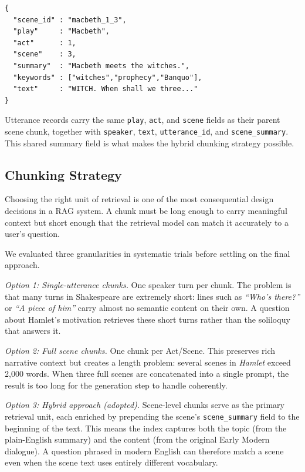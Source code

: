\documentclass[10pt,conference]{IEEEtran}
\begin{document}
\vspace{4pt}
\begin{minipage}{\columnwidth}
\begin{lstlisting}[caption={Scene-chunk record format (macbeth\_1\_3).}]
{
  "scene_id" : "macbeth_1_3",
  "play"     : "Macbeth",
  "act"      : 1,
  "scene"    : 3,
  "summary"  : "Macbeth meets the witches.",
  "keywords" : ["witches","prophecy","Banquo"],
  "text"     : "WITCH. When shall we three..."
}
\end{lstlisting}
\end{minipage}

\vspace{4pt}
Utterance records carry the same \texttt{play}, \texttt{act}, and
\texttt{scene} fields as their parent scene chunk, together with
\texttt{speaker}, \texttt{text}, \texttt{utterance\_id}, and
\texttt{scene\_summary}. This shared summary field is what makes the
hybrid chunking strategy possible.

\subsection{Chunking Strategy}

Choosing the right unit of retrieval is one of the most consequential
design decisions in a RAG system. A chunk must be long enough to carry
meaningful context but short enough that the retrieval model can match
it accurately to a user's question.

We evaluated three granularities in systematic trials before settling
on the final approach.

\medskip\noindent\textit{Option 1: Single-utterance chunks.} One
speaker turn per chunk. The problem is that many turns in Shakespeare
are extremely short: lines such as \textit{``Who's there?''} or
\textit{``A piece of him''} carry almost no semantic content on their
own. A question about Hamlet's motivation retrieves these short turns
rather than the soliloquy that answers it.

\medskip\noindent\textit{Option 2: Full scene chunks.} One chunk per
Act/Scene. This preserves rich narrative context but creates a length
problem: several scenes in \textit{Hamlet} exceed 2,000 words. When
three full scenes are concatenated into a single prompt, the result
is too long for the generation step to handle coherently.

\medskip\noindent\textit{Option 3: Hybrid approach (adopted).}
Scene-level chunks serve as the primary retrieval unit, each enriched
by prepending the scene's \texttt{scene\_summary} field to the
beginning of the text. This means the index captures both the
topic (from the plain-English summary) and the content (from the
original Early Modern dialogue). A question phrased in modern English
can therefore match a scene even when the scene text uses entirely
different vocabulary.
\end{document}
